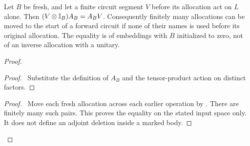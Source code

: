 \begin{lemma}\label{lem:reserve}
Let $B$ be fresh, and let a finite circuit segment $V$ before its
allocation act on $L$ alone. Then
$(V\otimes\mathbb{I}_B)A_B=A_BV$. Consequently finitely many allocations can
be moved to the start of a forward circuit if none of their names is used
before its original allocation. The equality is of embeddings with
$B$ initialized to zero, not of an inverse allocation with a unitary.
\end{lemma}
\begin{proof}
 \begin{proof}\pf\ Substitute the definition of $A_B$ and the
 tensor-product action on distinct factors.\end{proof}
 \qedstep
 \begin{proof}\pf\ Move each fresh allocation across each earlier
 operation by . There are finitely many such
 pairs. This proves the equality on the stated input space only.
 It does not define an adjoint deletion inside a marked body.\end{proof}
\end{proof}

